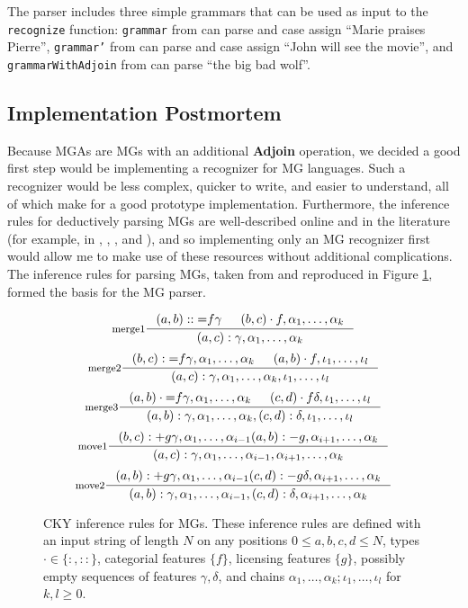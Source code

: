 \documentclass{article}
\begin{document}
The parser includes three simple grammars that can be used as input to
the \texttt{recognize} function: \texttt{grammar} from
\cite{fowlie2015} can parse and case assign ``Marie praises Pierre'',
\texttt{grammar'} from \cite{sportiche2013} can parse and case assign
``John will see the movie'', and \texttt{grammarWithAdjoin} from
\cite{fowlie2015} can parse ``the big bad wolf''.


\subsection{Implementation Postmortem}
\label{sec:implementation-postmortem}

Because MGAs are MGs with an additional \textbf{Adjoin} operation, we
decided a good first step would be implementing a recognizer for MG
languages.  Such a recognizer would be less complex, quicker to write,
and easier to understand, all of which make for a good prototype
implementation.  Furthermore, the inference rules for deductively
parsing MGs are well-described online and in the literature (for
example, in \cite{stabler2001}, \cite{harkema2001}, \cite{dost2011},
and \cite{sportiche2013}), and so implementing only an MG recognizer
first would allow me to make use of these resources without additional
complications.  The inference rules for parsing MGs, taken from
\cite{stabler2001} and reproduced in Figure
\ref{fig:mg-cky-inference}, formed the basis for the MG parser.

\begin{figure}[h]
  \centering
  \[
    \inference[merge1]{
      (a, b) :: \text{=}f \gamma &
      (b, c) \cdot f, \alpha_1, \dots, \alpha_k
    }{
      (a, c) : \gamma, \alpha_1, \dots, \alpha_k
    }
  \]
  \[
    \inference[merge2]{
      (b, c) : \text{=}f \gamma, \alpha_1, \dots, \alpha_k &
      (a, b) \cdot f, \iota_1, \dots, \iota_l
    }{
      (a, c) : \gamma, \alpha_1, \dots, \alpha_k, \iota_1, \dots, \iota_l
    }
  \]
  \[
    \inference[merge3]{
      (a, b) \cdot \text{=}f \gamma, \alpha_1, \dots, \alpha_k &
      (c, d) \cdot f \delta, \iota_1, \dots, \iota_l
    }{
      (a, b) : \gamma, \alpha_1, \dots, \alpha_k, (c, d) : \delta, \iota_1, \dots, \iota_l
    }
  \]
  \[
    \inference[move1]{
      (b, c) : +g \gamma, \alpha_1, \dots, \alpha_{i-1}
      (a, b) : -g, \alpha_{i+1}, \dots, \alpha_k
    }{
      (a, c) : \gamma, \alpha_1, \dots, \alpha_{i-1}, \alpha_{i+1}, \dots, \alpha_k
    }
  \]
  \[
    \inference[move2]{
      (a, b) : +g \gamma, \alpha_1, \dots, \alpha_{i-1}
      (c, d) : -g \delta, \alpha_{i+1}, \dots, \alpha_k
    }{
      (a, b) : \gamma, \alpha_1, \dots, \alpha_{i-1}, (c, d) : \delta, \alpha_{i+1}, \dots, \alpha_k
    }
  \]
  \caption{CKY inference rules for MGs.  These inference rules are
    defined with an input string of length $N$ on any positions
    $0 \leq a,b,c,d \leq N$, types $\cdot \in \{ :, :: \}$, categorial
    features $\{f\}$, licensing features $\{g\}$, possibly empty
    sequences of features $\gamma, \delta$, and chains
    $\alpha_1, \dots, \alpha_k; \iota_1,\dots,\iota_l$ for
    $k, l \geq 0$.}
  \label{fig:mg-cky-inference}
\end{figure}
\end{document}
